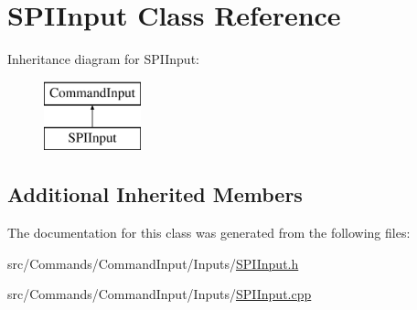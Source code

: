 \hypertarget{classSPIInput}{}\section{S\+P\+I\+Input Class Reference}
\label{classSPIInput}
Inheritance diagram for S\+P\+I\+Input\+:\begin{figure}[H]
\begin{center}
\leavevmode
\includegraphics[height=2.000000cm]{classSPIInput}
\end{center}
\end{figure}
\subsection*{Additional Inherited Members}


The documentation for this class was generated from the following files\+:\begin{DoxyCompactItemize}
\item 
src/\+Commands/\+Command\+Input/\+Inputs/\hyperlink{SPIInput_8h}{S\+P\+I\+Input.\+h}\item 
src/\+Commands/\+Command\+Input/\+Inputs/\hyperlink{SPIInput_8cpp}{S\+P\+I\+Input.\+cpp}\end{DoxyCompactItemize}
